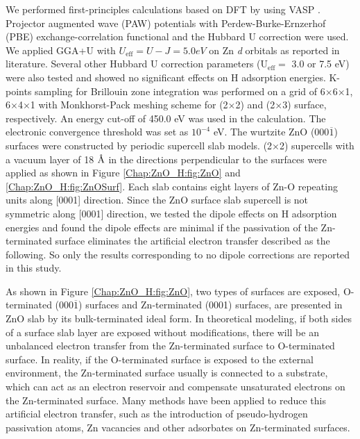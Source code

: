 We performed first-principles calculations based on \ac{DFT} by using \ac{VASP} \cite{kresse1996efficient,kresse1999ultrasoft}. Projector augmented wave (PAW) \cite{blochl1994projector} potentials with Perdew-Burke-Ernzerhof (PBE) \cite{perdew1996generalized} exchange-correlation functional and the Hubbard U correction \cite{dudarev1998electron} were used. We applied GGA+U with $U_\text{eff}=U - J = 5.0 eV$ on Zn \textit{d} orbitals as reported in literature\cite{huang2012detailed, oba2010native}. Several other Hubbard U correction parameters ($\text{U}_\text{eff} =$ 3.0 or 7.5 eV) were also tested and showed no significant effects on H adsorption energies. K-points sampling for Brillouin zone integration was performed on a grid of 6$\times$6$\times$1, 6$\times$4$\times$1 with Monkhorst-Pack meshing scheme for (2$\times$2) and (2$\times$3) surface, respectively\cite{monkhorst1976special}. An energy cut-off of 450.0 eV was used in the calculation. The electronic convergence threshold was set as $10^{-4}$ eV. The wurtzite ZnO (000$\overline{1}$) surfaces were constructed by periodic supercell slab models. (2$\times$2) supercells with a vacuum layer of 18 $\mbox{\normalfont\AA}$ in the directions perpendicular to the surfaces were applied as shown in Figure \ref{Chap:ZnO_H:fig:ZnO} and \ref{Chap:ZnO_H:fig:ZnOSurf}. Each slab contains eight layers of Zn-O repeating units along [0001] direction. Since the ZnO surface slab supercell is not symmetric along [0001] direction, we tested the dipole effects on H adsorption energies and found the dipole effects are minimal if the passivation of the Zn-terminated surface eliminates the artificial electron transfer described as the following. So only the results corresponding to no dipole corrections are reported in this study.

As shown in Figure \ref{Chap:ZnO_H:fig:ZnO}, two types of surfaces are exposed, O-terminated (000$\overline{1}$) surfaces and Zn-terminated  (0001) surfaces, are presented in ZnO slab by its bulk-terminated ideal form. In theoretical modeling, if both sides of a surface slab layer are exposed without modifications, there will be an unbalanced electron transfer from the Zn-terminated surface to O-terminated surface\cite{Meyer03}. In reality, if the O-terminated surface is exposed to the external environment, the Zn-terminated surface usually is connected to a substrate, which can act as an electron reservoir and compensate unsaturated electrons on the Zn-terminated surface. Many methods have been applied to reduce this artificial electron transfer, such as the introduction of pseudo-hydrogen passivation atoms, Zn vacancies and other adsorbates on Zn-terminated surfaces\cite{calzolari2013dipolar,lin2007microscopic,lahmer2015effect}.

